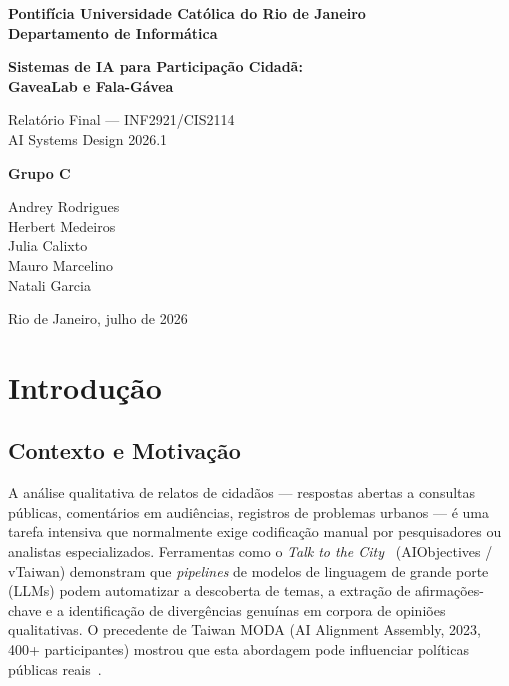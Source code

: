 \documentclass[12pt,a4paper]{article}
\begin{document}
\begin{titlepage}
  \centering
  \vspace*{2cm}
  {\Large\bfseries Pontifícia Universidade Católica do Rio de Janeiro\\[0.3em]
  Departamento de Informática\par}
  \vspace{1.5cm}
  {\LARGE\bfseries Sistemas de IA para Participação Cidadã:\\[0.3em]
  GaveaLab e Fala-Gávea\par}
  \vspace{1cm}
  {\large Relatório Final — INF2921/CIS2114\\
  AI Systems Design 2026.1\par}
  \vspace{2cm}
  {\large\bfseries Grupo C\par}
  \vspace{0.5cm}
  {\large
  Andrey Rodrigues\\
  Herbert Medeiros\\
  Julia Calixto\\
  Mauro Marcelino\\
  Natali Garcia\par}
  \vspace{2cm}
  {\large Rio de Janeiro, julho de 2026\par}
  \vfill
\end{titlepage}

\begin{abstract}
\noindent
{}
\end{abstract}

\newpage
\tableofcontents
\newpage

\section{Introdução}

\subsection{Contexto e Motivação}

A análise qualitativa de relatos de cidadãos — respostas abertas a consultas públicas,
comentários em audiências, registros de problemas urbanos — é uma tarefa intensiva que
normalmente exige codificação manual por pesquisadores ou analistas especializados.
Ferramentas como o \textit{Talk to the City}~\cite{tttc2023} (AIObjectives / vTaiwan)
demonstram que \textit{pipelines} de modelos de linguagem de grande porte (LLMs) podem
automatizar a descoberta de temas, a extração de afirmações-chave e a identificação de
divergências genuínas em corpora de opiniões qualitativas. O precedente de Taiwan MODA
(AI Alignment Assembly, 2023, 400+ participantes) mostrou que esta abordagem pode
influenciar políticas públicas reais~\cite{vtaiwan2023}.
\end{document}

